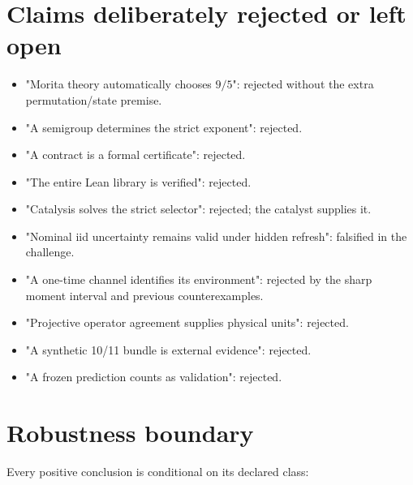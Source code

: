 \documentclass[11pt,a4paper,openany]{report}
\begin{document}
\section{Claims deliberately rejected or left open}

\begin{itemize}
\item 
"Morita theory automatically chooses \(9/5\)": rejected without the extra permutation/\allowbreak{}state premise.

\item 
"A semigroup determines the strict exponent": rejected.

\item 
"A contract is a formal certificate": rejected.

\item 
"The entire Lean library is verified": rejected.

\item 
"Catalysis solves the strict selector": rejected; the catalyst supplies it.

\item 
"Nominal iid uncertainty remains valid under hidden refresh": falsified in the challenge.

\item 
"A one-time channel identifies its environment": rejected by the sharp moment interval and previous counterexamples.

\item 
"Projective operator agreement supplies physical units": rejected.

\item 
"A synthetic 10/\allowbreak{}11 bundle is external evidence": rejected.

\item 
"A frozen prediction counts as validation": rejected.

\end{itemize}

\section{Robustness boundary}

Every positive conclusion is conditional on its declared class:
\end{document}
